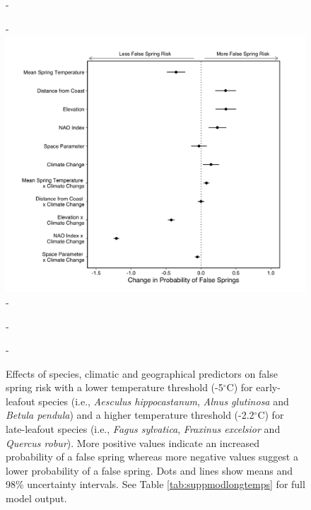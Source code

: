 \documentclass{article}\usepackage[]{graphicx}\usepackage[]{color}
\begin{document}
  {\begin{figure} [H]
  -\begin{center}
  -\includegraphics[width=12cm]{..//..//analyses/figures/model_output_98_longtemps.png}
  -\caption{Effects of species, climatic and geographical predictors on false spring risk with a lower temperature threshold (-5$^{\circ}$C) for early-leafout species (i.e., \textit{Aesculus hippocastanum}, \textit{Alnus glutinosa} and \textit{Betula pendula}) and a higher temperature threshold (-2.2$^{\circ}$C) for late-leafout species (i.e., \textit{Fagus sylvatica}, \textit{Fraxinus excelsior} and \textit{Quercus robur}). More positive values indicate an increased probability of a false spring whereas more negative values suggest a lower probability of a false spring. Dots and lines show means and 98\% uncertainty intervals. See Table \ref{tab:suppmodlongtemps} for full model output. }\label{fig:longtemps}
  -\end{center}
  -\end{figure}}
  
\end{document}
